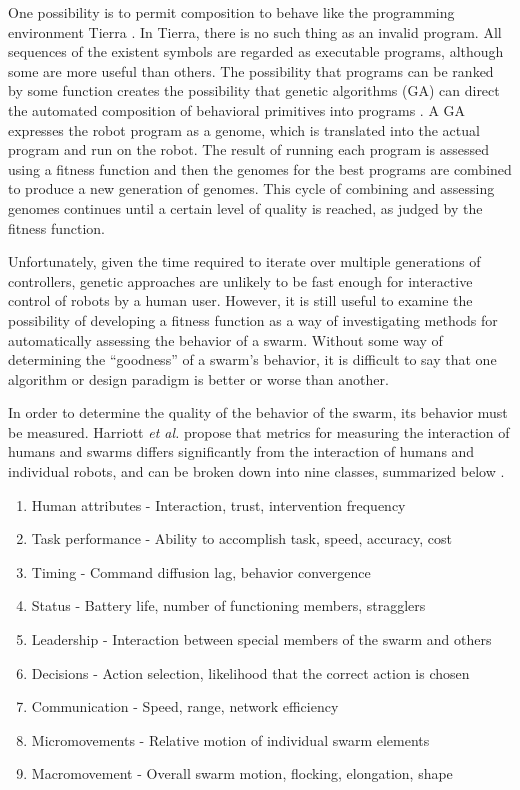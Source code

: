 One possibility is to permit composition to behave like the programming environment Tierra \citep{ray1991approach}.
In Tierra, there is no such thing as an invalid program. 
All sequences of the existent symbols are regarded as executable programs, although some are more useful than others. 
The possibility that programs can be ranked by some function creates the possibility that genetic algorithms (GA) can direct the automated composition of behavioral primitives into programs \citep{palmer2005emergence}.
A GA expresses the robot program as a genome, which is translated into the actual program and run on the robot. 
The result of running each program is assessed using a fitness function and then the genomes for the best programs are combined to produce a new generation of genomes. 
This cycle of combining and assessing genomes continues until a certain level of quality is reached, as judged by the fitness function.

Unfortunately, given the time required to iterate over multiple generations of controllers, genetic approaches are unlikely to be fast enough for interactive control of robots by a human user. 
However, it is still useful to examine the possibility of developing a fitness function as a way of investigating methods for automatically assessing the behavior of a swarm.
Without some way of determining the ``goodness'' of a swarm's behavior, it is difficult to say that one algorithm or design paradigm is better or worse than another. 

In order to determine the quality of the behavior of the swarm, its behavior must be measured.
Harriott \emph{et al.} propose that metrics for measuring the interaction of humans and swarms differs significantly from the interaction of humans and individual robots, and can be broken down into nine classes, summarized below \citep{harriott2014biologically}. 
\begin{enumerate}[noitemsep]
\item Human attributes - Interaction, trust, intervention frequency 
\item Task performance - Ability to accomplish task, speed, accuracy, cost
\item Timing - Command diffusion lag, behavior convergence
\item Status - Battery life, number of functioning members, stragglers
\item Leadership - Interaction between special members of the swarm and others
\item Decisions - Action selection, likelihood that the correct action is chosen
\item Communication - Speed, range, network efficiency
\item Micromovements - Relative motion of individual swarm elements
\item Macromovement - Overall swarm motion, flocking, elongation, shape 
\end{enumerate}

